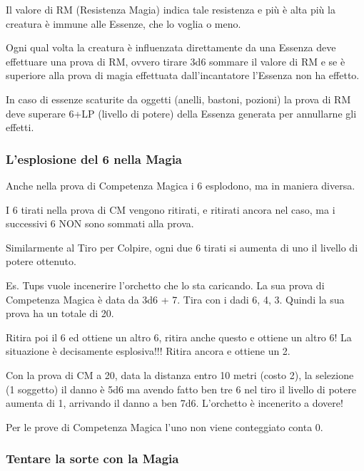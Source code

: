 \documentclass[a4paper,11pt,twoside,openany]{book}
\begin{document}
Il valore di RM (Resistenza Magia) indica tale resistenza e più è alta più la creatura è immune alle Essenze, che lo voglia o meno.

Ogni qual volta la creatura è influenzata direttamente da una Essenza deve effettuare una prova di RM, ovvero tirare 3d6 sommare il valore di RM e se è superiore alla prova di magia effettuata dall'incantatore l'Essenza non ha effetto.

In caso di essenze scaturite da oggetti (anelli, bastoni, pozioni)
la prova di RM deve superare 6+LP (livello di potere) della Essenza
generata per annullarne gli effetti.

\subsubsection{L'esplosione del 6 nella Magia}

\label{lesplosione-del-6-nella-magia}

Anche nella prova di Competenza Magica i 6 esplodono, ma in maniera diversa.

I 6 tirati nella prova di CM vengono ritirati, e ritirati ancora nel caso, ma i successivi 6 NON sono sommati alla prova.

Similarmente al Tiro per Colpire, ogni due 6 tirati si aumenta di uno il livello di potere ottenuto.

Es. Tups vuole incenerire l'orchetto che lo sta caricando. La sua prova di Competenza Magica è data da 3d6 + 7. Tira con i dadi 6, 4, 3. Quindi la sua prova ha un totale di 20.

Ritira poi il 6 ed ottiene un altro 6, ritira anche questo e ottiene un altro 6! La situazione è decisamente esplosiva!!! Ritira ancora e ottiene un 2.

Con la prova di CM a 20, data la distanza entro 10 metri (costo 2), la selezione (1 soggetto) il danno è 5d6 ma avendo fatto ben tre 6 nel tiro il livello di potere aumenta di 1, arrivando il danno a ben 7d6. L'orchetto è incenerito a dovere!

Per le prove di Competenza Magica l'uno non viene conteggiato conta 0.

\subsubsection{Tentare la sorte con la Magia}

\label{tentare-la-sorte-con-la-magia}
\end{document}

